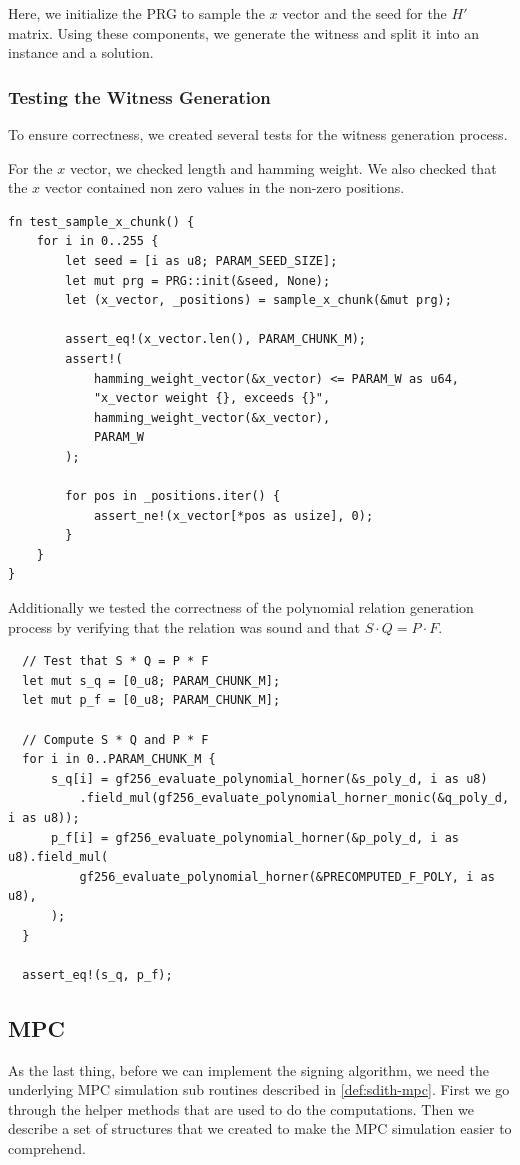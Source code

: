 \documentclass[11pt]{report}
\theoremstyle{definition}
\theoremstyle{plain}
\begin{document}
Here, we initialize the PRG to sample the $x$ vector and the seed for the $H'$ matrix. Using these components, we generate the witness and split it into an instance and a solution.

\subsubsection{Testing the Witness Generation}\label{sub:testing_our_witness_generation}

To ensure correctness, we created several tests for the witness generation process.

For the $x$ vector, we checked length and hamming weight. We also checked that the $x$ vector contained non zero values in the non-zero positions.

\begin{verbatim}
fn test_sample_x_chunk() {
    for i in 0..255 {
        let seed = [i as u8; PARAM_SEED_SIZE];
        let mut prg = PRG::init(&seed, None);
        let (x_vector, _positions) = sample_x_chunk(&mut prg);

        assert_eq!(x_vector.len(), PARAM_CHUNK_M);
        assert!(
            hamming_weight_vector(&x_vector) <= PARAM_W as u64,
            "x_vector weight {}, exceeds {}",
            hamming_weight_vector(&x_vector),
            PARAM_W
        );

        for pos in _positions.iter() {
            assert_ne!(x_vector[*pos as usize], 0);
        }
    }
}
\end{verbatim}

Additionally we tested the correctness of the polynomial relation generation process by verifying that the relation was sound and that $S \cdot Q = P \cdot F$.

\begin{verbatim}
  // Test that S * Q = P * F
  let mut s_q = [0_u8; PARAM_CHUNK_M];
  let mut p_f = [0_u8; PARAM_CHUNK_M];

  // Compute S * Q and P * F
  for i in 0..PARAM_CHUNK_M {
      s_q[i] = gf256_evaluate_polynomial_horner(&s_poly_d, i as u8)
          .field_mul(gf256_evaluate_polynomial_horner_monic(&q_poly_d, i as u8));
      p_f[i] = gf256_evaluate_polynomial_horner(&p_poly_d, i as u8).field_mul(
          gf256_evaluate_polynomial_horner(&PRECOMPUTED_F_POLY, i as u8),
      );
  }

  assert_eq!(s_q, p_f);
\end{verbatim}

\subsection{MPC}\label{sub:mpc_algo}
As the last thing, before we can implement the signing algorithm, we need the underlying MPC simulation sub routines described in \autoref{def:sdith-mpc}.
First we go through the helper methods that are used to do the computations. Then we describe a set of structures that we created to make the MPC simulation easier to comprehend.
\end{document}
